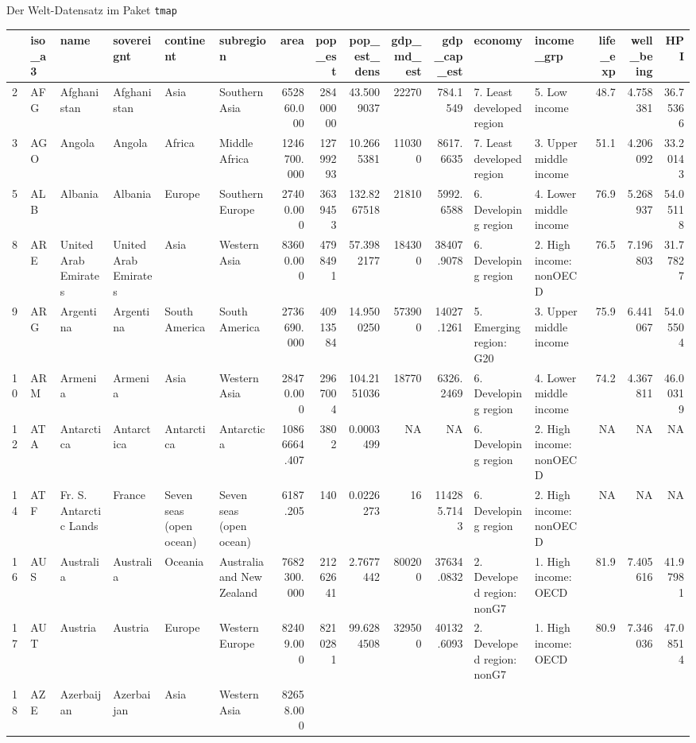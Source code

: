 \documentclass[ignorenonframetext,]{beamer}
\begin{document}
\begin{frame}{Der Welt-Datensatz im Paket \texttt{tmap}}

\begin{longtable}[]{@{}llllllrrrrrllrrr@{}}
\toprule
& iso\_a3 & name & sovereignt & continent & subregion & area & pop\_est
& pop\_est\_dens & gdp\_md\_est & gdp\_cap\_est & economy & income\_grp
& life\_exp & well\_being & HPI\tabularnewline
\midrule
\endhead
2 & AFG & Afghanistan & Afghanistan & Asia & Southern Asia & 652860.000
& 28400000 & 43.5009037 & 22270 & 784.1549 & 7. Least developed region &
5. Low income & 48.7 & 4.758381 & 36.75366\tabularnewline
3 & AGO & Angola & Angola & Africa & Middle Africa & 1246700.000 &
12799293 & 10.2665381 & 110300 & 8617.6635 & 7. Least developed region &
3. Upper middle income & 51.1 & 4.206092 & 33.20143\tabularnewline
5 & ALB & Albania & Albania & Europe & Southern Europe & 27400.000 &
3639453 & 132.8267518 & 21810 & 5992.6588 & 6. Developing region & 4.
Lower middle income & 76.9 & 5.268937 & 54.05118\tabularnewline
8 & ARE & United Arab Emirates & United Arab Emirates & Asia & Western
Asia & 83600.000 & 4798491 & 57.3982177 & 184300 & 38407.9078 & 6.
Developing region & 2. High income: nonOECD & 76.5 & 7.196803 &
31.77827\tabularnewline
9 & ARG & Argentina & Argentina & South America & South America &
2736690.000 & 40913584 & 14.9500250 & 573900 & 14027.1261 & 5. Emerging
region: G20 & 3. Upper middle income & 75.9 & 6.441067 &
54.05504\tabularnewline
10 & ARM & Armenia & Armenia & Asia & Western Asia & 28470.000 & 2967004
& 104.2151036 & 18770 & 6326.2469 & 6. Developing region & 4. Lower
middle income & 74.2 & 4.367811 & 46.00319\tabularnewline
12 & ATA & Antarctica & Antarctica & Antarctica & Antarctica &
10866664.407 & 3802 & 0.0003499 & NA & NA & 6. Developing region & 2.
High income: nonOECD & NA & NA & NA\tabularnewline
14 & ATF & Fr. S. Antarctic Lands & France & Seven seas (open ocean) &
Seven seas (open ocean) & 6187.205 & 140 & 0.0226273 & 16 & 114285.7143
& 6. Developing region & 2. High income: nonOECD & NA & NA &
NA\tabularnewline
16 & AUS & Australia & Australia & Oceania & Australia and New Zealand &
7682300.000 & 21262641 & 2.7677442 & 800200 & 37634.0832 & 2. Developed
region: nonG7 & 1. High income: OECD & 81.9 & 7.405616 &
41.97981\tabularnewline
17 & AUT & Austria & Austria & Europe & Western Europe & 82409.000 &
8210281 & 99.6284508 & 329500 & 40132.6093 & 2. Developed region: nonG7
& 1. High income: OECD & 80.9 & 7.346036 & 47.08514\tabularnewline
18 & AZE & Azerbaijan & Azerbaijan & Asia & Western Asia & 82658.000 &

\end{longtable}
\end{frame}
\end{document}

